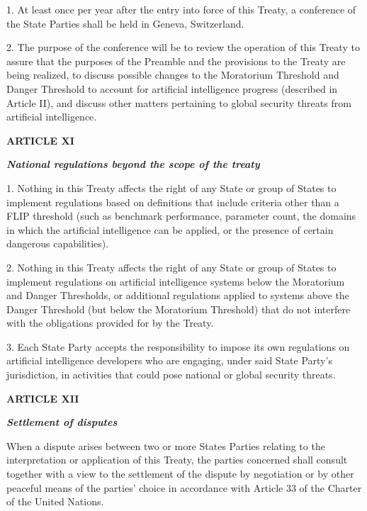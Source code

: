 \documentclass[12pt,a4paper]{article}
\begin{document}
1. At least once per year after the entry into force of this Treaty, a conference of the State Parties shall be held in Geneva, Switzerland. 

2. The purpose of the conference will be to review the operation of this Treaty to assure that the purposes of the Preamble and the provisions to the Treaty are being realized, to discuss possible changes to the Moratorium Threshold and Danger Threshold to account for artificial intelligence progress (described in Article II), and discuss other matters pertaining to global security threats from artificial intelligence. 

\begin{center}

\textbf{{ARTICLE XI}}

\textbf{\textit{National regulations beyond the scope of the treaty}}
\end{center}

1. Nothing in this Treaty affects the right of any State or group of States to implement regulations based on definitions that include criteria other than a FLIP threshold (such as benchmark performance, parameter count, the domains in which the artificial intelligence can be applied, or the presence of certain dangerous capabilities). 

2. Nothing in this Treaty affects the right of any State or group of States to implement regulations on artificial intelligence systems below the Moratorium and Danger Thresholds, or additional regulations applied to systems above the Danger Threshold (but below the Moratorium Threshold) that do not interfere with the obligations provided for by the Treaty.

3. Each State Party accepts the responsibility to impose its own regulations on artificial intelligence developers who are engaging, under said State Party’s jurisdiction, in activities that could pose national or global security threats.

\begin{center}

\textbf{{ARTICLE XII}}

\textbf{\textit{Settlement of disputes}}
\end{center}

When a dispute arises between two or more States Parties relating to the interpretation or application of this Treaty, the parties concerned shall consult together with a view to the settlement of the dispute by negotiation or by other peaceful means of the parties’ choice in accordance with Article 33 of the Charter of the United Nations. 
\end{document}
